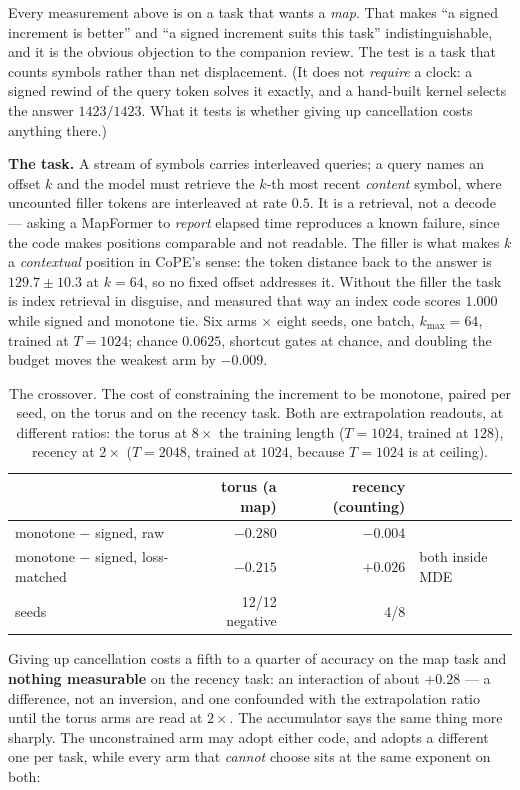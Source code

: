 \documentclass[11pt]{article}
\begin{document}
Every measurement above is on a task that wants a \emph{map}. That makes
``a signed increment is better'' and ``a signed increment suits this task''
indistinguishable, and it is the obvious objection to the companion review. The
test is a task that counts symbols rather than net displacement. (It does not
\emph{require} a clock: a signed rewind of the query token solves it exactly, and a
hand-built kernel selects the answer $1423/1423$. What it tests is whether giving up
cancellation costs anything there.)

\textbf{The task.} A stream of symbols carries interleaved queries; a query names
an offset $k$ and the model must retrieve the $k$-th most recent \emph{content}
symbol, where uncounted filler tokens are interleaved at rate $0.5$. It is a
retrieval, not a decode --- asking a MapFormer to \emph{report} elapsed time
reproduces a known failure, since the code makes positions comparable and not
readable. The filler is what makes $k$ a \emph{contextual} position in CoPE's
sense: the token distance back to the answer is $129.7 \pm 10.3$ at $k=64$, so no
fixed offset addresses it. Without the filler the task is index retrieval in
disguise, and measured that way an index code scores $1.000$ while signed and
monotone tie. Six arms $\times$ eight seeds, one batch, $k_{\max}=64$, trained at
$T=1024$; chance $0.0625$, shortcut gates at chance, and doubling the budget moves
the weakest arm by $-0.009$.

\begin{table}[htbp]\centering\small
\caption{The crossover. The cost of constraining the increment to be monotone, paired per seed, on the torus and on the recency task. Both are extrapolation readouts, at different ratios: the torus at $8\times$ the training length ($T{=}1024$, trained at $128$), recency at $2\times$ ($T{=}2048$, trained at $1024$, because $T{=}1024$ is at ceiling).}
\label{tab:crossover}
\begin{tabular}{lrrl}
\toprule
 & torus (a map) & recency (counting) & \\
\midrule
monotone $-$ signed, raw & $-0.280$ & $-0.004$ & \\
monotone $-$ signed, loss-matched & $-0.215$ & $+0.026$ & both inside MDE \\
seeds & 12/12 negative & 4/8 & \\
\bottomrule
\end{tabular}
\end{table}

\noindent Giving up cancellation costs a fifth to a quarter of accuracy on the map
task and \textbf{nothing measurable} on the recency task: an interaction of about
$+0.28$ --- a difference, not an inversion, and one confounded with the extrapolation
ratio until the torus arms are read at $2\times$. The accumulator says the same thing more sharply. The unconstrained arm
may adopt either code, and adopts a different one per task, while every arm that
\emph{cannot} choose sits at the same exponent on both:
\end{document}
